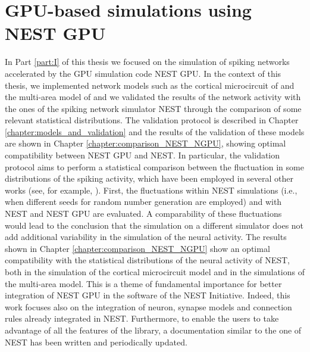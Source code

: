 \documentclass[a4paper, 12pt, twoside, openright]{book}
\begin{document}
\section*{GPU-based simulations using NEST GPU}
In Part \ref{part:I} of this thesis we focused on the simulation of spiking networks accelerated by the GPU simulation code NEST GPU. In the context of this thesis, we implemented network models such as the cortical microcircuit of \cite{Potjans2012} and the multi-area model of \cite{Schmidt2018,Schmidt2018b} and we validated the results of the network activity with the ones of the spiking network simulator NEST through the comparison of some relevant statistical distributions. The validation protocol is described in Chapter \ref{chapter:models_and_validation} and the results of the validation of these models are shown in Chapter \ref{chapter:comparison_NEST_NGPU}, showing optimal compatibility between NEST GPU and NEST. In particular, the validation protocol aims to perform a statistical comparison between the fluctuation in some distributions of the spiking activity, which have been employed in several other works (see, for example, \cite{VanAlbada2018, Knight2018, Dasbach2021, Heittmann2022}).
First, the fluctuations within NEST simulations (i.e., when different seeds for random number generation are employed) and with NEST and NEST GPU are evaluated. A comparability of these fluctuations would lead to the conclusion that the simulation on a different simulator does not add additional variability in the simulation of the neural activity. The results shown in Chapter \ref{chapter:comparison_NEST_NGPU} show an optimal compatibility with the statistical distributions of the neural activity of NEST, both in the simulation of the cortical microcircuit model and in the simulations of the multi-area model. This is a theme of fundamental importance for better integration of NEST GPU in the software of the NEST Initiative. Indeed, this work focuses also on the integration of neuron, synapse models and connection rules already integrated in NEST. Furthermore, to enable the users to take advantage of all the features of the library, a documentation similar to the one of NEST has been written and periodically updated.\\
\end{document}

